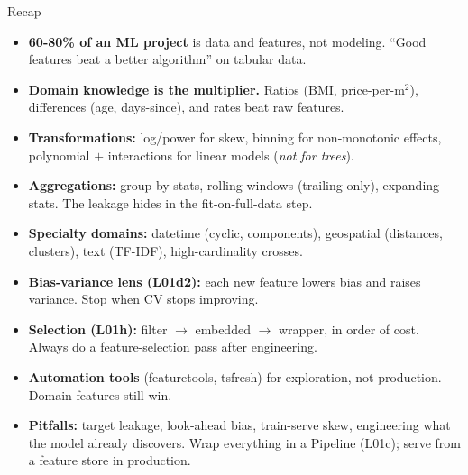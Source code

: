 \documentclass[aspectratio=169]{beamer}
\begin{document}
\begin{frame}{Recap}
  \begin{itemize}\small
    \item \textbf{60-80\% of an ML project} is data and features, not modeling. ``Good features beat a better algorithm'' on tabular data.
    \item \textbf{Domain knowledge is the multiplier.} Ratios (BMI, price-per-m$^2$), differences (age, days-since), and rates beat raw features.
    \item \textbf{Transformations:} log/power for skew, binning for non-monotonic effects, polynomial $+$ interactions for linear models (\emph{not for trees}).
    \item \textbf{Aggregations:} group-by stats, rolling windows (trailing only), expanding stats. The leakage hides in the fit-on-full-data step.
    \item \textbf{Specialty domains:} datetime (cyclic, components), geospatial (distances, clusters), text (TF-IDF), high-cardinality crosses.
    \item \textbf{Bias-variance lens (L01d2):} each new feature lowers bias and raises variance. Stop when CV stops improving.
    \item \textbf{Selection (L01h):} filter $\to$ embedded $\to$ wrapper, in order of cost. Always do a feature-selection pass after engineering.
    \item \textbf{Automation tools} (featuretools, tsfresh) for exploration, not production. Domain features still win.
    \item \textbf{Pitfalls:} target leakage, look-ahead bias, train-serve skew, engineering what the model already discovers. Wrap everything in a Pipeline (L01c); serve from a feature store in production.
  \end{itemize}
\end{frame}
\end{document}
